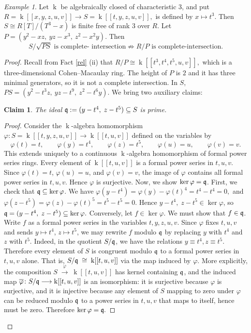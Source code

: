 \documentclass[10pt,a4paper]{amsart}
\newtheorem{claim}[theorem]{Claim}
\theoremstyle{definition}
\theoremstyle{remark}
\newtheorem{example}[theorem]{Example}
\newcommand{\kk}{\operatorname{k}}
\newcommand{\q}{\frak{q}}
\begin{document}
\begin{example}\label{32}
	Let $\kk$ be algebraically closed of characteristic $3$, and put
	\(
	R=\kk[[x,y,z,u,v]]\to S=\kk[[t,y,z,u,v]],
	\)
is defined by $x\mapsto t^3$. Then
	\(
	S\cong R[T]/(T^3-x)
	\)
	is finite free of rank $3$ over $R$. Let
	\(
	P=(y^2-xz,\ yz-x^3,\ z^2-x^2y).
	\)
	Then \[
	{S/\sqrt{PS}\text{ is complete- intersection}\not\Longrightarrow R/P\text{ is complete-intersection}}.
	\]
\end{example}

\begin{proof}
	Recall from  {Fact} \ref{rel} (ii) that
	\(
	R/P\cong\kk[[t^3,t^4,t^5,u,v]],
	\) which is a three-dimensional Cohen--Macaulay ring. The height of $P$ is
	$2$ and it has three minimal generators, so it is not a complete intersection.
	In $S$,
	\(
	PS=(y^2-t^3z,\ yz-t^9,\ z^2-t^6y).
	\)
We bring two auxiliary claims:	
\begin{claim}\label{1}
		The ideal
		\(
		\q:=(y-t^4,\;z-t^5)\subseteq S
		\)
		is prime.
	\end{claim}
	
	\begin{proof}
Consider the \(\kk\)-algebra homomorphism
		\(
		\varphi\colon S=\kk[[t,y,z,u,v]]\to \kk[[t,u,v]]
		\)
		defined on the variables by
		\[
		\varphi(t)=t,\qquad
		\varphi(y)=t^4,\qquad
		\varphi(z)=t^5,\qquad
		\varphi(u)=u,\qquad
		\varphi(v)=v.
		\]
		This extends uniquely to a continuous \(\kk\)-algebra homomorphism of
		formal power series rings.
		Every element of \(\kk[[t,u,v]]\) is a formal power series in
		\(t,u,v\). Since \(\varphi(t)=t\), \(\varphi(u)=u\), and
		\(\varphi(v)=v\), the image of \(\varphi\) contains all formal power
		series in \(t,u,v\). Hence \(\varphi\) is surjective.
Now, we show \(\ker\varphi=\q\). 
		First, we check that \(\q\subseteq\ker\varphi\). We have
		\(
		\varphi(y-t^4)=\varphi(y)-\varphi(t)^4=t^4-t^4=0,
		\)
		and
		\(
		\varphi(z-t^5)=\varphi(z)-\varphi(t)^5=t^5-t^5=0.
		\)
		Hence \(y-t^4,\;z-t^5\in\ker\varphi\), so
		\(
		\q=(y-t^4,\;z-t^5)\subseteq\ker\varphi.
		\)
		Conversely, let \(f\in\ker\varphi\). We must show that
		\(f\in\q\). Write \(f\) as a formal power series in the variables
		\(t,y,z,u,v\). Since \(\varphi\) fixes \(t,u,v\) and sends
		\(y\mapsto t^4\), \(z\mapsto t^5\), we may rewrite \(f\) modulo
		\(\q\) by replacing \(y\) with \(t^4\) and \(z\) with \(t^5\).
		Indeed, in the quotient \(S/\q\), we have the relations
		\(
		y\equiv t^4,  z\equiv t^5.
		\)
		Therefore every element of \(S\) is congruent modulo \(\q\) to a
		formal power series in \(t,u,v\) alone. That is,
		\(
		S/\q\;\cong\;\kk[[t,u,v]]
		\)
		via the map induced by \(\varphi\).
		More explicitly, the composition
		\(
		S\;\xrightarrow{\;\varphi\;}\;\kk[[t,u,v]]
		\)
		has kernel containing \(\q\), and the induced map
		\(
		\overline{\varphi}\colon S/\q\longrightarrow \kk[[t,u,v]]
		\)
		is an isomorphism: it is surjective because \(\varphi\) is
		surjective, and it is injective because any element of \(S\) mapping
		to zero under \(\varphi\) can be reduced modulo \(\q\) to a power
		series in \(t,u,v\) that maps to itself, hence must be zero.
		Therefore
		\(
		\ker\varphi=\q.
		\)
	\end{proof}
	

\end{proof}
\end{document}
